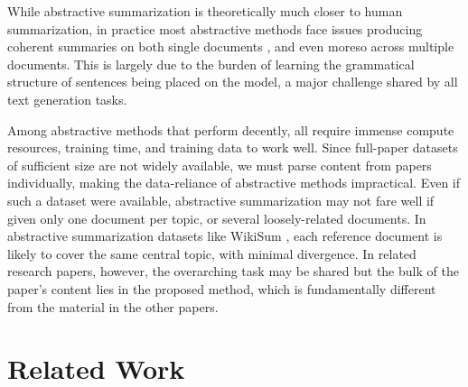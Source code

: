 \documentclass[conference]{sig-alternate-05-2015}
\begin{document}
While abstractive summarization is theoretically much closer to human summarization, in practice most 
abstractive methods face issues producing coherent summaries on both single documents \cite{mds2017}, and even moreso 
across multiple documents. This is largely due to the burden of learning the grammatical structure of sentences being 
placed on the model, a major challenge shared by all text generation tasks. %

Among abstractive methods that perform decently, all require 
immense compute resources, training time, and training data to work well. Since full-paper datasets of sufficient size are not 
widely available, we must parse content from papers individually, making the data-reliance of abstractive 
methods impractical. Even if such a dataset were available, abstractive summarization may not fare well if given 
only one document per topic, or several loosely-related documents. In abstractive summarization datasets like WikiSum \cite{wikisum}, 
each reference document is likely to cover the same central topic, with minimal divergence. In related research papers, however, the overarching task 
may be shared but the bulk of the paper's content lies in the proposed method, which is fundamentally different from the 
material in the other papers.




\section{Related Work}\label{sec:related}

\end{document}
